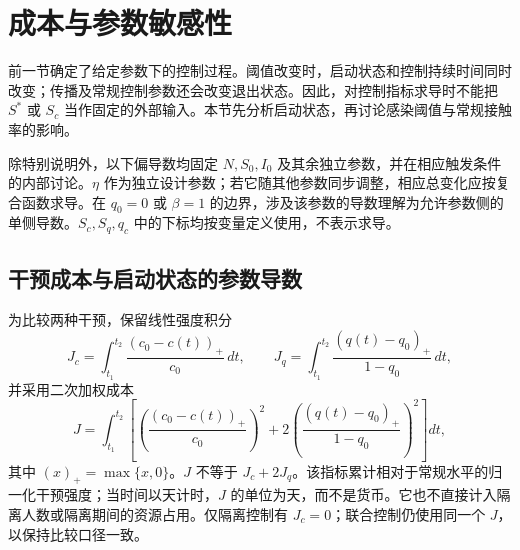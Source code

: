 \section{成本与参数敏感性}
\label{sec:cost}
前一节确定了给定参数下的控制过程。阈值改变时，启动状态和控制持续时间同时改变；传播及常规控制参数还会改变退出状态。因此，对控制指标求导时不能把 $S^*$ 或 $S_c$ 当作固定的外部输入。本节先分析启动状态，再讨论感染阈值与常规接触率的影响。

除特别说明外，以下偏导数均固定 $N,S_0,I_0$ 及其余独立参数，并在相应触发条件的内部讨论。$\eta$ 作为独立设计参数；若它随其他参数同步调整，相应总变化应按复合函数求导。在 $q_0=0$ 或 $\beta=1$ 的边界，涉及该参数的导数理解为允许参数侧的单侧导数。$S_c,S_q,q_c$ 中的下标均按变量定义使用，不表示求导。

\subsection{干预成本与启动状态的参数导数}
为比较两种干预，保留线性强度积分
\begin{equation}
J_c=\int_{t_1}^{t_2}\frac{(c_0-c(t))_+}{c_0}\,dt,
\qquad
J_q=\int_{t_1}^{t_2}\frac{(q(t)-q_0)_+}{1-q_0}\,dt,
\label{eq:cost:linear}
\end{equation}
并采用二次加权成本
\begin{equation}
J=\int_{t_1}^{t_2}\left[
\left(\frac{(c_0-c(t))_+}{c_0}\right)^2
+2\left(\frac{(q(t)-q_0)_+}{1-q_0}\right)^2\right]dt,
\label{eq:cost:J}
\end{equation}
其中 $(x)_+=\max\{x,0\}$。$J$ 不等于 $J_c+2J_q$。该指标累计相对于常规水平的归一化干预强度；当时间以天计时，$J$ 的单位为天，而不是货币。它也不直接计入隔离人数或隔离期间的资源占用。仅隔离控制有 $J_c=0$；联合控制仍使用同一个 $J$，以保持比较口径一致。

